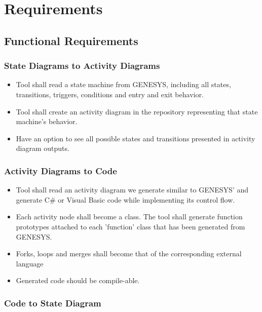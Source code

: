 \chapter{Requirements}
\label{Requirements}


\section{Functional Requirements}
\subsection{State Diagrams to Activity Diagrams}
\begin{itemize}
  \item Tool shall read a state machine from GENESYS, including all states, transitions, triggers, conditions and entry and exit behavior.
  \item Tool shall create an activity diagram in the repository representing that state machine's behavior.
  \item Have an option to see all possible states and transitions presented in activity diagram outputs.
\end{itemize}

\subsection{Activity Diagrams to Code}

\begin{itemize}
  \item Tool shall read an activity diagram we generate similar to GENESYS' and generate C\# or Visual Basic code while implementing its control flow.
  \item Each activity node shall become a class. The tool shall generate function prototypes attached to each 'function' class that has been generated from GENESYS.
  \item Forks, loops and merges shall become that of the corresponding external language 
  \item Generated code should be compile-able.
\end{itemize}


\subsection{Code to State Diagram}

